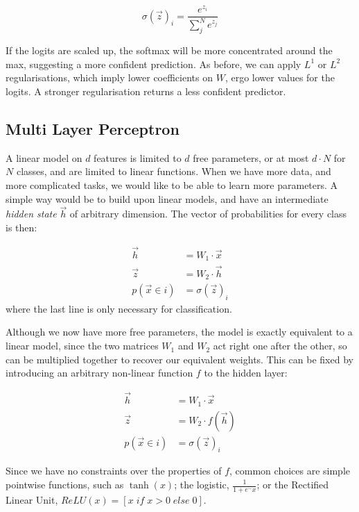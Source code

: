 \begin{equation*}
\sigma(\vec{z})_i = \frac{e^{z_i}}{\sum_j^N e^{z_j}}
\end{equation*}

If the logits are scaled up, the softmax will be more concentrated around the max, suggesting a more confident prediction.
As before, we can apply $L^1$ or $L^2$ regularisations, which imply lower coefficients on $W$, ergo lower values for the logits.
A stronger regularisation returns a less confident predictor.

\begin{center}
\end{center}


\subsection{Multi Layer Perceptron}
A linear model on $d$ features is limited to $d$ free parameters, or at most $d \cdot N$ for $N$ classes, and are limited to linear functions.
When we have more data, and more complicated tasks, we would like to be able to learn more parameters.
A simple way would be to build upon linear models, and have an intermediate \emph{hidden state} $\vec{h}$ of arbitrary dimension.
The vector of probabilities for every class is then:

\begin{align*}
\vec{h} &= W_1 \cdot \vec{x} \\
\vec{z} &= W_2 \cdot \vec{h} \\
p(\vec x \in i) &= \sigma(\vec z)_i
\end{align*}
where the last line is only necessary for classification.

Although we now have more free parameters, the model is exactly equivalent to a linear model, since the two matrices $W_1$ and $W_2$ act right one after the other, so can be multiplied together to recover our equivalent weights.
This can be fixed by introducing an arbitrary non-linear function $f$ to the hidden layer:

\begin{align*}
\vec{h} &= W_1 \cdot \vec{x} \\
\vec{z} &= W_2 \cdot f(\vec{h}) \\
p(\vec x \in i) &= \sigma(\vec z)_i
\end{align*}

Since we have no constraints over the properties of $f$, common choices are simple pointwise functions, such as $\tanh(x)$; the logistic, $\frac{1}{1 + e^-x}$; or the Rectified Linear Unit, $ReLU(x)=[x \; if \; x > 0 \; else \; 0]$.

